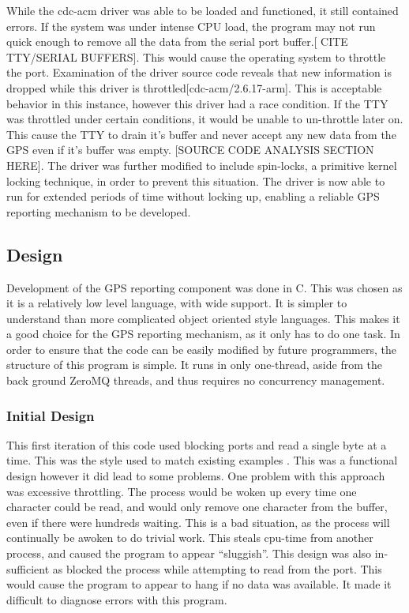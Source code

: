 While the cdc-acm driver was able to be loaded and functioned, it still contained errors. If the system was under intense CPU load, the program may not run quick enough to remove all the data from the serial port buffer.[ CITE TTY/SERIAL BUFFERS]. This would cause the operating system to throttle the port. Examination of the driver source code reveals that new information is dropped while this driver is throttled[cdc-acm/2.6.17-arm]. This is acceptable behavior in this instance, however this driver had a race condition. If the TTY was throttled under certain conditions, it would be unable to un-throttle later on. This cause the TTY to drain it’s buffer and never accept any new data from the GPS even if it’s buffer was empty. [SOURCE CODE ANALYSIS SECTION HERE]. The driver was further modified to include spin-locks, a primitive kernel locking technique, in order to prevent this situation. The driver is now able to run for extended periods of time without locking up, enabling a reliable GPS reporting mechanism to be developed. 

\subsection {Design}

Development of the GPS reporting component was done in C. This was chosen as it is a relatively low level language, with wide support. It is simpler to understand than more complicated object oriented style languages. This makes it a good choice for the GPS reporting mechanism, as it only has to do one task. In order to ensure that the code can be easily modified by future programmers, the structure of this program is simple. It runs in only one-thread, aside from the back ground ZeroMQ threads, and thus requires no concurrency management.

\subsubsection{Initial Design}

This first iteration of this code used blocking ports and read a single byte at a time. This was the style used to match existing examples \cite{thesis_varma}. This was a functional design however it did lead to some problems. One problem with this approach was excessive throttling. The process would be woken up every time one character could be read, and would only remove one character from the buffer, even if there were hundreds waiting. This is a bad situation, as the process will continually be awoken to do trivial work. This steals cpu-time from another process, and caused the program to appear “sluggish”. This design was also in-sufficient as blocked the process while attempting to read from the port. This would cause the program to appear to hang if no data was available. It made it difficult to diagnose errors with this program.


